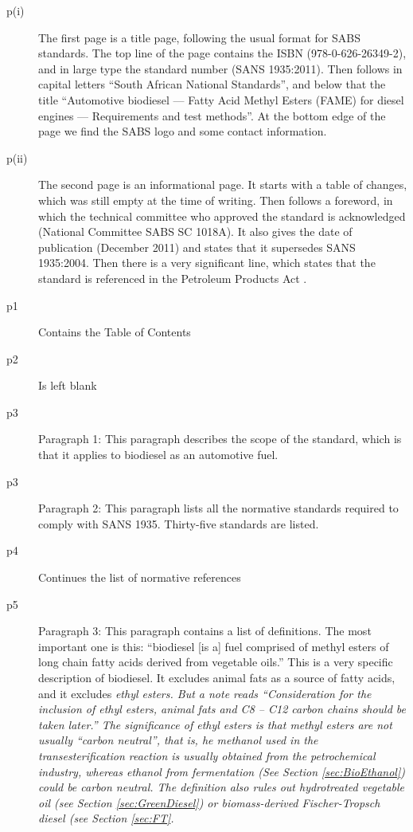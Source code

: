 \begin{description}


\item[p(i)]{The first page is a title page, following the usual format for SABS
standards. The top line of the page contains the ISBN (978-0-626-26349-2), and
in large type the standard number (SANS 1935:2011). Then follows in capital
letters ``South African National Standards'', and below that the title
``Automotive biodiesel --- Fatty Acid Methyl Esters (FAME) for diesel engines
--- Requirements and test methods''. At the bottom edge of the page we find the
SABS logo and some contact information.}

\item[p(ii)]{The second page is an informational page. It starts with a table of
changes, which was still empty at the time of writing. Then follows a foreword,
in which the technical committee who approved the standard is acknowledged
(National Committee SABS SC 1018A). It also gives the date of publication
(December 2011) and states that it supersedes SANS 1935:2004. Then there is a
very significant line, which states that the standard is referenced in the
Petroleum Products Act \autocite{Act120-1997}. }
	
\item[p1]{Contains the Table of Contents} 

\item[p2]{Is left blank}

\item[p3]{Paragraph 1: This paragraph describes the scope of the standard, which
is that it applies to biodiesel as an automotive fuel.} 

\item[p3]{Paragraph 2:
This paragraph lists all the normative standards required to comply with SANS
1935. Thirty-five standards are listed.}

\item[p4]{Continues the list of normative references}

\item[p5]{Paragraph 3: This paragraph contains a list of definitions. The most
important one is this: ``biodiesel [is a] fuel comprised of methyl esters of
long chain fatty acids derived from vegetable oils.'' This is a very specific
description of biodiesel. It excludes animal fats as a source of fatty acids,
and it excludes \em{ethyl} esters. But a note reads ``Consideration for the
inclusion of ethyl esters, animal fats and C8 – C12 carbon chains should be
taken later.'' The significance of ethyl esters is that methyl esters are not
usually ``carbon neutral'', that is, he methanol used in the transesterification
reaction is usually obtained from the petrochemical industry, whereas ethanol
from fermentation (See Section \ref{sec:BioEthanol}) could be carbon neutral.
The definition also rules out hydrotreated vegetable oil (see Section
\ref{sec:GreenDiesel}) or biomass-derived Fischer-Tropsch diesel (see Section
\ref{sec:FT}.}


\end{description}
